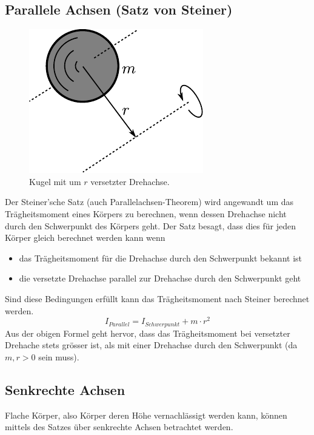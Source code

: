 \subsection{Parallele Achsen (Satz von Steiner)}
\begin{figure}[h!]
	\centering
	\includegraphics[scale=0.7]{steiner.pdf}
	\caption{Kugel mit um $r$ versetzter Drehachse.}
	\label{fig:steiner}
\end{figure}

\noindent
Der Steiner'sche Satz (auch Parallelachsen-Theorem) wird angewandt um
das Trägheitsmoment eines Körpers zu berechnen, wenn dessen Drehachse nicht
durch den Schwerpunkt des Körpers geht. Der Satz besagt, dass dies für 
jeden Körper gleich berechnet werden kann wenn
\begin{itemize}
	\item das Trägheitsmoment für die Drehachse durch den Schwerpunkt
		bekannt ist
	\item die versetzte Drehachse parallel zur Drehachse durch den
		Schwerpunkt geht
\end{itemize}
Sind diese Bedingungen erfüllt kann das Trägheitsmoment nach Steiner
berechnet werden.
\[ \boxed{ I_{Parallel} = I_{Schwerpunkt} + m \cdot r^2 } \]
Aus der obigen Formel geht hervor, dass das Trägheitsmoment bei versetzter
Drehache stets grösser ist, als mit einer Drehachse durch den Schwerpunkt
(da $m,r>0$ sein muss).

\subsection{Senkrechte Achsen}
Flache Körper, also Körper deren Höhe vernachlässigt werden kann, können
mittels des Satzes über senkrechte Achsen betrachtet werden.


